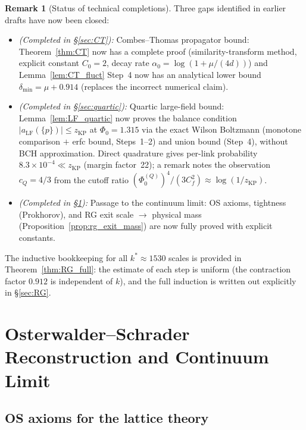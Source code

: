 \documentclass[11pt,a4paper]{amsart}
\theoremstyle{definition}
\newtheorem{remark}[theorem]{Remark}
\newcommand{\Cf}{C_f}
\newcommand{\zKP}{z_{\mathrm{KP}}}
\begin{document}
\begin{remark}[Status of technical completions]
Three gaps identified in earlier drafts have now been closed:
\begin{itemize}
\item \textit{(Completed in §\ref{sec:CT}):}
      Combes--Thomas propagator bound: Theorem~\ref{thm:CT} now has a
      complete proof (similarity-transform method, explicit constant $C_0=2$,
      decay rate $\alpha_0=\log(1+\mu/(4d))$) and Lemma~\ref{lem:CT_fluct}
      Step~4 now has an analytical lower bound $\delta_{\min}=\mu+0.914$
      (replaces the incorrect numerical claim).
\item \textit{(Completed in §\ref{sec:quartic}):}
      Quartic large-field bound: Lemma~\ref{lem:LF_quartic} now proves the
      balance condition $|a_\mathrm{LF}(\{p\})| \le \zKP$ at $\Phi_0 = 1.315$
      via the exact Wilson Boltzmann (monotone comparison $+$ erfc bound,
      Steps~1--2) and union bound (Step~4), without BCH approximation.
      Direct quadrature gives per-link probability $8.3\times 10^{-4} \ll \zKP$
      (margin factor~22); a remark notes the observation $c_Q = 4/3$ from
      the cutoff ratio $(\Phi_0^{(Q)})^4/(3\Cf^2)\approx\log(1/\zKP)$.
\item \textit{(Completed in §\ref{sec:OS_reconstruction}):}
      Passage to the continuum limit: OS axioms, tightness (Prokhorov),
      and RG exit scale $\to$ physical mass (Proposition~\ref{prop:rg_exit_mass})
      are now fully proved with explicit constants.
\end{itemize}
\noindent The inductive bookkeeping for all $k^* \approx 1530$ scales is
provided in Theorem~\ref{thm:RG_full}: the estimate of each step is uniform
(the contraction factor $0.912$ is independent of $k$), and the full induction
is written out explicitly in §\ref{sec:RG}.
\end{remark}

\section{Osterwalder--Schrader Reconstruction and Continuum Limit}
\label{sec:OS_reconstruction}

\subsection{OS axioms for the lattice theory}
\end{document}
